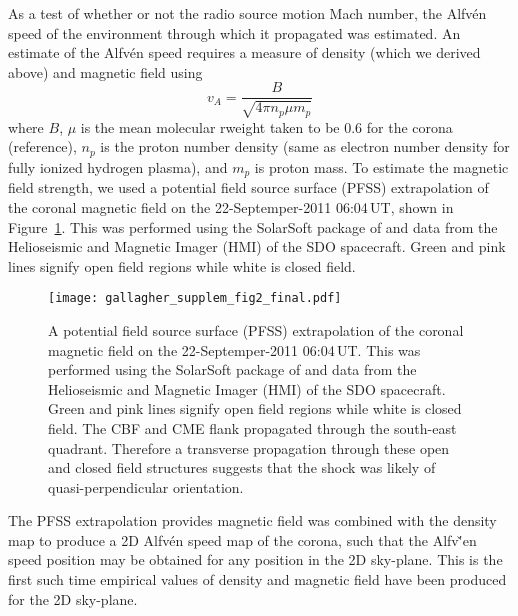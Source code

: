As a test of whether or not the radio source motion Mach number, the Alfv\'{e}n speed of the environment through which it propagated was estimated. An estimate of the Alfv\'{e}n speed requires a measure of density (which we derived above) and magnetic field using 
\begin{equation}
v_A = \frac{B}{\sqrt{4\pi n_p \mu m_p}}
\end{equation}
where $B$, $\mu$ is the mean molecular rweight taken to be 0.6 for the corona (reference), $n_p$ is the proton number density (same as electron number density for fully ionized hydrogen plasma), and $m_p$ is proton mass. To estimate the magnetic field strength, we used a potential field source surface (PFSS) extrapolation of the coronal magnetic field on the 22-Septemper-2011 06:04\,UT, shown in Figure~\ref{fig:pfss}. 
This was performed using the SolarSoft package of \citet{schrijver2003} and data from the Helioseismic and Magnetic Imager (HMI)\citep{scherrer2012} of the SDO spacecraft. Green and pink lines signify open field regions while white is closed field.
\begin{figure}[t!]
\begin{center}
\texttt{[image: gallagher\_supplem\_fig2\_final.pdf]}
\caption{A potential field source surface (PFSS) extrapolation of the coronal magnetic field on the 22-Septemper-2011 06:04\,UT. This was performed using the SolarSoft package of \citet{schrijver2003} and data from the Helioseismic and Magnetic Imager (HMI)\citep{scherrer2012} of the SDO spacecraft. Green and pink lines signify open field regions while white is closed field. The CBF and CME flank propagated through the south-east quadrant. Therefore a transverse propagation through these open and closed field structures suggests that the shock was likely of quasi-perpendicular orientation.}%
\label{fig:pfss}
\end{center}
\end{figure}
The PFSS extrapolation provides magnetic field was combined with the density map to produce a 2D Alfv\'{e}n speed map of the corona, such that the Alfv\v'{e}n speed position may be obtained for any position in the 2D sky-plane. This is the first such time empirical values of density and magnetic field have been produced for the 2D sky-plane. 

